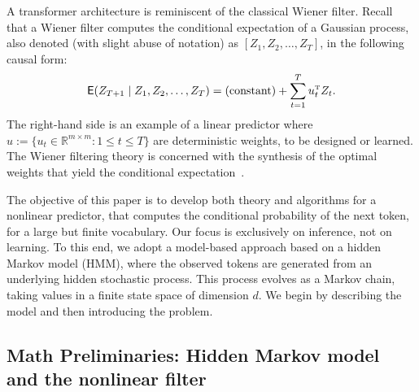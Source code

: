 \documentclass[twoside,11pt]{article}
\def\Re{\mathbb{R}}
\newcommand{\field}[1]{\mathbb{#1}}
\def\Re{\field{R}}
\def\transpose{{\hbox{\rm\tiny T}}}
\def\E{{\sf E}}
\def\Re{\mathbb{R}}
\def\E{{\sf E}}
\renewcommand{\Re}{\mathbb{R}}
\def\E{{\sf E}}
\begin{document}
A transformer architecture is reminiscent of the classical Wiener filter.
Recall that a Wiener filter computes the conditional expectation of a Gaussian process, also denoted (with slight abuse of notation) as $[Z_1,Z_2,\hdots,Z_T]$, in the following
causal form:
\begin{equation*}
  \E(Z_{T+1} \mid Z_1,Z_{2},\hdots,Z_T) = \text{(constant)} + \sum_{t=1}^T u_t^\transpose Z_t.  
\end{equation*}
The right-hand side is an example of a linear predictor where $u:=\{u_t\in\Re^{m\times m}:1\leq t\leq T\}$ are deterministic weights, to be designed or learned.  
The Wiener filtering theory is concerned with the synthesis of the optimal weights that
yield the conditional expectation~\cite[Ch.~7]{kailath2000linear}.

The objective of this paper is to develop both theory and algorithms for a nonlinear predictor, that computes the conditional probability of the next token, for a large but finite vocabulary. 
Our focus is exclusively on inference, not on learning. 
To this end, we adopt a model-based approach based on a hidden Markov model (HMM), where the observed tokens are generated from an underlying hidden stochastic process. 
This process evolves as a Markov chain, taking values in a finite state space of dimension $d$. 
We begin by describing the model and then introducing the problem. 


\subsection{Math Preliminaries: Hidden Markov model and the nonlinear filter}
\end{document}
